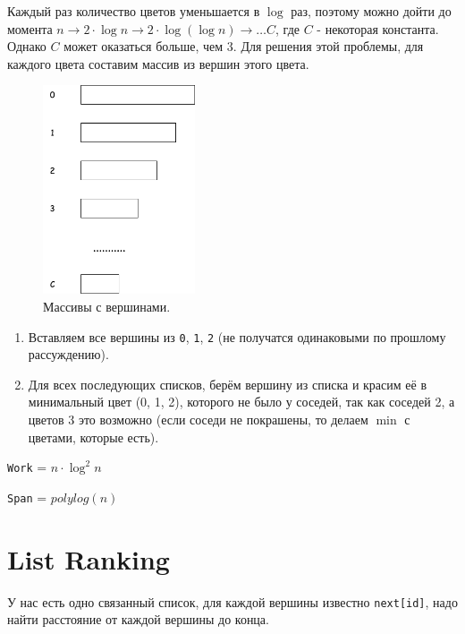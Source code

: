 \documentclass[11pt]{article}
\begin{document}
    Каждый раз количество цветов уменьшается в $\log$ раз, поэтому можно дойти до момента $n \rightarrow 2 \cdot \log{n} \rightarrow 2 \cdot \log{(\log{n})} \rightarrow \dots C$, где $C$ - некоторая константа.
    Однако $C$ может оказаться больше, чем $3$.
    Для решения этой проблемы, для каждого цвета составим массив из вершин этого цвета.

    \begin{figure}[h!]
        \centering
        \includegraphics[width=0.4\textwidth]{Pictures/Symmetry breaking/Diagram Painting}
        \caption{Массивы с вершинами.}
        \label{fig:painting}
    \end{figure}

    \begin{enumerate}
        \item Вставляем все вершины из \texttt{0}, \texttt{1}, \texttt{2} (не получатся одинаковыми по прошлому рассуждению).
        \item Для всех последующих списков, берём вершину из списка и красим её в минимальный цвет (0, 1, 2), которого не было у соседей, так как соседей 2, а цветов 3 это возможно (если соседи не покрашены, то делаем $\min$ с цветами, которые есть).
    \end{enumerate}

    \texttt{Work} = $n \cdot \log^2{n}$

    \texttt{Span} = $polylog(n)$

    \section*{List Ranking}

    У нас есть одно связанный список, для каждой вершины известно \texttt{next[id]}, надо найти расстояние от каждой вершины до конца.
\end{document}
